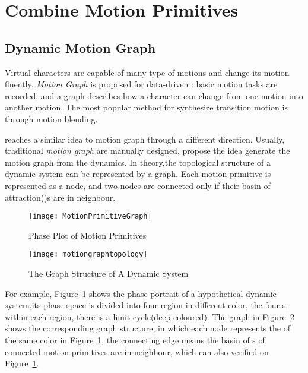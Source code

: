 \section{Combine Motion Primitives}
\label{sec:manyprimitive}

\subsection{Dynamic Motion Graph}
Virtual characters are capable of many type of motions and change its motion fluently.
\emph{Motion Graph}\citep{kovar2008motion} is proposed for data-driven \cms:
basic motion tasks are recorded, and a graph describes how a character can change from one motion into another motion. 
The most popular method for synthesize transition motion is through motion blending.


\moit reaches a similar idea to motion graph through a different direction.
Usually, traditional \emph{motion graph} are manually designed, \moit propose the idea generate the motion graph from the dynamics.
In theory,the topological structure of a dynamic system can be represented by a  graph.
Each motion primitive is represented as a node, and two nodes are connected only if their basin of attraction(\boa)s are in neighbour.

\begin{figure}[!htbp]
  \begin{center}
	\texttt{[image: MotionPrimitiveGraph]}
    \caption{Phase Plot of Motion Primitives}
    \label{fig:manyprimitives}
  \end{center}
\end{figure}


\begin{figure}[!htbp]
  \begin{center}
      \texttt{[image: motiongraphtopology]}
    \caption{The Graph Structure of A Dynamic System}
    \label{fig:manyprimitivesgraph}
  \end{center}
\end{figure}

For example, Figure~\ref{fig:manyprimitives} shows the phase portrait of a hypothetical dynamic system,its phase space is divided into four region in different color, the four \boa s, within each region, there is a limit cycle(deep coloured).
The graph in Figure~\ref{fig:manyprimitivesgraph} shows the corresponding graph structure, in which each node represents the \boa of the same color in Figure~\ref{fig:manyprimitives}, the connecting edge means the basin of {\boa}s of connected motion primitives are in neighbour, which can also verified on Figure~\ref{fig:manyprimitives}.


